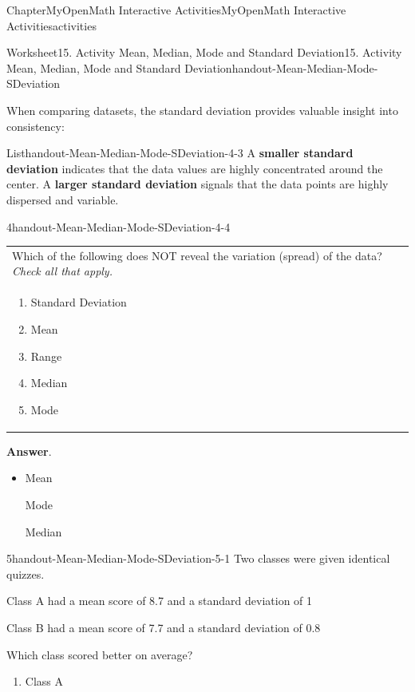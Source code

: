 \documentclass[oneside,10pt,]{book}
\newcommand{\blocktitlefont}{\relax}
\newcommand{\tabularfont}{\relax}
\newcommand{\ptxlistdisc}{\raisebox{0.3ex}{\textbullet}}
\newcommand{\terminology}[1]{\textbf{#1}}
\begin{document}
\begin{chapterptx}{Chapter}{MyOpenMath Interactive Activities}{}{MyOpenMath Interactive Activities}{}{}{activities}
\begin{worksheet-section}{Worksheet}{15. Activity Mean, Median, Mode and Standard Deviation}{}{15. Activity Mean, Median, Mode and Standard Deviation}{}{}{handout-Mean-Median-Mode-SDeviation}
\par
When comparing datasets, the standard deviation provides valuable insight into consistency:%
\begin{listptx}{List}{\textbf{}}{handout-Mean-Median-Mode-SDeviation-4-3}{}%
A \terminology{smaller standard deviation} indicates that the data values are highly concentrated around the center.%
A \terminology{larger standard deviation} signals that the data points are highly dispersed and variable.%
\end{listptx}%
\begin{divisionexercise}{4}{}{}{handout-Mean-Median-Mode-SDeviation-4-4}%
\begin{center}%
{\tabularfont%
\begin{tabular}{l}
Which of the following does NOT reveal the variation (spread) of the data?  \emph{Check all that apply.}\tabularnewline[0pt]
\multicolumn{1}{m{0.2\linewidth}}{\raggedright%
%
\begin{enumerate}[label={(\alph*)}]
\item{}Standard Deviation%
\item{}Mean%
\item{}Range%
\item{}Median%
\item{}Mode%
\end{enumerate}
%
}
\end{tabular}
}%
\end{center}%
\par\smallskip%
\noindent\textbf{\blocktitlefont Answer}.\hypertarget{handout-Mean-Median-Mode-SDeviation-4-4-2}{}\quad{}%
\begin{itemize}[label=\ptxlistdisc]
\item{}Mean%
\par
Mode%
\par
Median%
\end{itemize}
%
\end{divisionexercise}%
\clearpage
\begin{divisionexercise}{5}{}{}{handout-Mean-Median-Mode-SDeviation-5-1}%
Two classes were given identical quizzes.%
\par
Class A had a mean score of 8.7 and a standard deviation of 1%
\par
Class B had a mean score of 7.7 and a standard deviation of 0.8%
\par
Which class scored better on average?%
\par
%
\begin{enumerate}[label={(\alph*)}]
\item{}Class A%

\end{enumerate}
\end{divisionexercise}
\end{worksheet-section}
\end{chapterptx}
\end{document}

